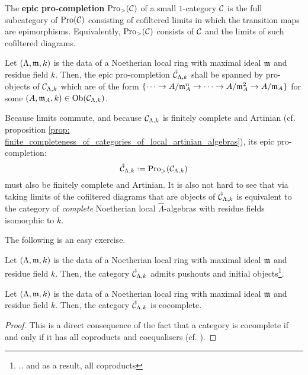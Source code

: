         \begin{definition} \label{def: epic_pro_objects}
            The \textbf{epic pro-completion} $\mathrm{Pro}
            _>(\mathcal{C})$ of a small $1$-category $\mathcal{C}$ is the full subcategory of $\mathrm{Pro}(\mathcal{C})$ consisting of cofiltered limits in which the transition maps are epimorphisms. Equivalently, $\mathrm{Pro}
            _>(\mathcal{C})$ consists of $\mathcal{C}$ and the limits of such cofiltered diagrams.  
        \end{definition}
        \begin{example} \label{example: completed_artinian_local_algebras}
            Let $(\Lambda, \mathfrak{m}, k)$ is the data of a Noetherian local ring with maximal ideal $\mathfrak{m}$ and residue field $k$. Then, the epic pro-completion $\hat{\mathcal{C}}_{\Lambda, k}$ shall be spanned by pro-objects of $\mathcal{C}_{\Lambda, k}$ which are of the form $\{\cdots \to A/\mathfrak{m}_A^n \to \cdots \to A/\mathfrak{m}_A^2 \to A/\mathfrak{m}_A\}$ for some $(A, \mathfrak{m}_A, k) \in \mathrm{Ob}(\mathcal{C}_{\Lambda, k})$. 
            
            Because limits commute, and because $\mathcal{C}_{\Lambda, k}$ is finitely complete and Artinian (cf. proposition \ref{prop: finite_completeness_of_categories_of_local_artinian_algebras}), its epic pro-completion:
                $$\hat{\mathcal{C}}_{\Lambda, k} := \mathrm{Pro}_>(\mathcal{C}_{\Lambda, k})$$
            must also be finitely complete and Artinian. It is also not hard to see that via taking limits of the cofiltered diagrams that are objects of $\hat{\mathcal{C}}_{\Lambda, k}$ is equivalent to the category of \textit{complete} Noetherian local $\hat{\Lambda}$-algebras with residue fields isomorphic to $k$.
        \end{example}
        The following is an easy exercise. 
        \begin{proposition} \label{prop: pushouts_and_coproducts_of_completed_artinian_local_algebras}
            Let $(\Lambda, \mathfrak{m}, k)$ is the data of a Noetherian local ring with maximal ideal $\mathfrak{m}$ and residue field $k$. Then, the category $\hat{\mathcal{C}}_{\Lambda, k}$ admits pushouts and initial objects\footnote{.. and as a result, all coproducts}.
        \end{proposition}
        \begin{corollary}
            Let $(\Lambda, \mathfrak{m}, k)$ is the data of a Noetherian local ring with maximal ideal $\mathfrak{m}$ and residue field $k$. Then, the category $\hat{\mathcal{C}}_{\Lambda, k}$ is cocomplete.
        \end{corollary}
            \begin{proof}
                This is a direct consequence of the fact that a category is cocomplete if and only if it has all coproducts and coequalisers (cf. \cite[Theorem V.2.1]{maclane}).
            \end{proof}
            
